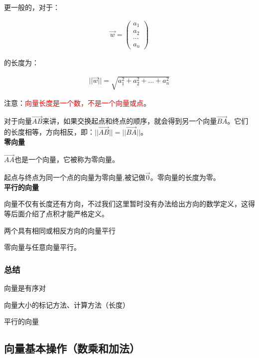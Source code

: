 \documentclass[UTF8]{ctexart}
\begin{document}
更一般的，对于：

\begin{equation}
\begin{aligned}
\vec{w}=
\begin{pmatrix}
a_{1}\\
a_{2}\\
\cdots\\
a_{n}
\end{pmatrix}
\end{aligned}
\end{equation}

的长度为：

\begin{equation}
\begin{aligned}
||\vec{w}||=\sqrt{a_{1}^{2}+a_{2}^{2}+\dots+a_{n}^{2}}
\end{aligned}
\end{equation}

注意：\textcolor{red}{向量长度是一个数，不是一个向量或点}。

对于向量$\overrightarrow{AB}$来讲，如果交换起点和终点的顺序，就会得到另一个向量$\overrightarrow{BA}$。它们的长度相等，方向相反，即：$||\overrightarrow{AB}||=||\overrightarrow{BA}||$。\\

\textbf{零向量}

$\overrightarrow{AA}$也是一个向量，它被称为零向量。

起点与终点为同一个点的向量为零向量,被记做$\vec{0}$。零向量的长度为零。\\

\textbf{平行的向量}

向量不仅有长度还有方向，不过我们这里暂时没有办法给出方向的数学定义，这得等后面介绍了点积才能严格定义。

两个具有相同或相反方向的向量平行

零向量与任意向量平行。

\subsubsection{总结}

向量是有序对

向量大小的标记方法、计算方法（长度）

平行的向量

\subsection{向量基本操作（数乘和加法）}
\end{document}
